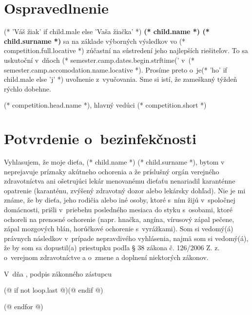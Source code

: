     \cutHere

    \section{Ospravedlnenie}
        (* 'Váš žiak' if child.male else 'Vaša žiačka' *) \textbf{(* child.name *) (* child.surname *)} sa na základe výborných výsledkov vo (* competition.full.locative *)
        zúčastní na sústredení jeho najlepších riešiteľov. To sa uskutoční v~dňoch (* semester.camp.dates.begin.strftime('%
        v~(* semester.camp.accomodation.name.locative *). Prosíme preto o~je(* 'ho' if child.male else 'j' *) uvoľnenie z~vyučovania.
        Sme si istí, že zameškaný týždeň rýchlo dobehne.
        \vspace{5mm}

        \hfill (* competition.head.name *), hlavný vedúci (* competition.short *)

    \cutHere

    \section{Potvrdenie o~bezinfekčnosti}
        Vyhlasujem, že moje dieťa, (* child.name *) (* child.surname *), bytom v~\makebox[30mm]{\dotfill} neprejavuje príznaky akútneho ochorenia a že
        príslušný orgán verejného zdravotníctva ani ošetrujúci lekár menovanému dieťaťu nenariadil
        karanténne opatrenie (karanténu, zvýšený zdravotný dozor alebo lekársky dohľad). Nie je mi známe, že
        by dieťa, jeho rodičia alebo iné osoby, ktoré s~ním žijú v~spoločnej domácnosti, prišli v~priebehu
        posledného mesiaca do styku s~osobami, ktoré ochoreli na prenosné ochorenie (napr. hnačka, angína,
        vírusový zápal pečene, zápal mozgových blán, horúčkové ochorenie s~vyrážkami). Som si
        vedomý(á) právnych následkov v~prípade nepravdivého vyhlásenia, najmä som si vedomý(á), že by som sa
        dopustil(a) priestupku podľa § 38 zákona č. 126/2006 Z. z. o~verejnom zdravotníctve a o~zmene a
        doplnení niektorých zákonov.
        \vspace{5mm}

        V~\dotfill dňa \dotfill, \hfill podpis zákonného zástupcu \dotfill

    (@ if not loop.last @)\newpage(@ endif @)

    (@ endfor @)

